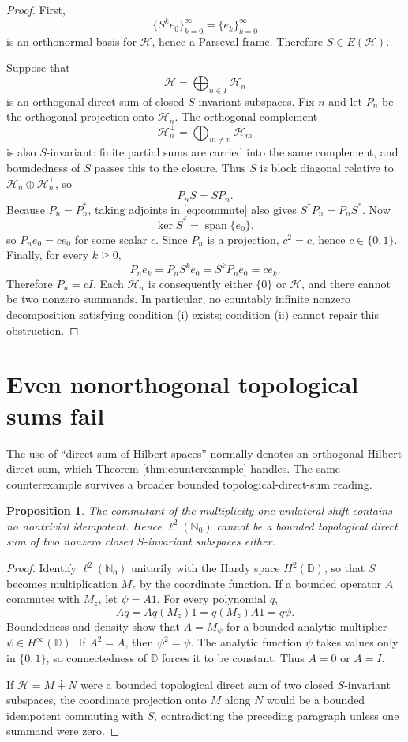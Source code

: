 \documentclass[11pt]{article}
\newtheorem{proposition}[theorem]{Proposition}
\newcommand{\Hh}{\mathcal H}
\newcommand{\N}{\mathbb N}
\begin{document}
\begin{proof}
First,
\[
 \{S^ke_0\}_{k=0}^{\infty}=\{e_k\}_{k=0}^{\infty}
\]
is an orthonormal basis for $\Hh$, hence a Parseval frame.  Therefore
$S\in E(\Hh)$.

Suppose that
\[
 \Hh=\bigoplus_{n\in I}\Hh_n
\]
is an orthogonal direct sum of closed $S$-invariant subspaces.  Fix $n$ and
let $P_n$ be the orthogonal projection onto $\Hh_n$.  The orthogonal
complement
\[
 \Hh_n^\perp=\bigoplus_{m\ne n}\Hh_m
\]
is also $S$-invariant: finite partial sums are carried into the same
complement, and boundedness of $S$ passes this to the closure.  Thus $S$ is
block diagonal relative to $\Hh_n\oplus\Hh_n^\perp$, so
\begin{equation}\label{eq:commute}
 P_nS=SP_n.
\end{equation}
Because $P_n=P_n^*$, taking adjoints in \eqref{eq:commute} also gives
$S^*P_n=P_nS^*$.  Now
\[
 \ker S^*=\operatorname{span}\{e_0\},
\]
so $P_ne_0=ce_0$ for some scalar $c$.  Since $P_n$ is a projection,
$c^2=c$, hence $c\in\{0,1\}$.  Finally, for every $k\ge0$,
\[
 P_ne_k=P_nS^ke_0=S^kP_ne_0=ce_k.
\]
Therefore $P_n=cI$.  Each $\Hh_n$ is consequently either $\{0\}$ or
$\Hh$, and there cannot be two nonzero summands.  In particular, no
countably infinite nonzero decomposition satisfying condition (i) exists;
condition (ii) cannot repair this obstruction.
\end{proof}

\section{Even nonorthogonal topological sums fail}

The use of ``direct sum of Hilbert spaces'' normally denotes an orthogonal
Hilbert direct sum, which Theorem \ref{thm:counterexample} handles.  The same
counterexample survives a broader bounded topological-direct-sum reading.

\begin{proposition}\label{prop:topological}
The commutant of the multiplicity-one unilateral shift contains no
nontrivial idempotent.  Hence $\ell^2(\N_0)$ cannot be a bounded topological
direct sum of two nonzero closed $S$-invariant subspaces either.
\end{proposition}

\begin{proof}
Identify $\ell^2(\N_0)$ unitarily with the Hardy space $H^2(\mathbb D)$,
so that $S$ becomes multiplication $M_z$ by the coordinate function.  If a
bounded operator $A$ commutes with $M_z$, let $\psi=A1$.  For every polynomial
$q$,
\[
 Aq=Aq(M_z)1=q(M_z)A1=q\psi.
\]
Boundedness and density show that $A=M_\psi$ for a bounded analytic
multiplier $\psi\in H^\infty(\mathbb D)$.  If $A^2=A$, then
$\psi^2=\psi$.  The analytic function $\psi$ takes values only in
$\{0,1\}$, so connectedness of $\mathbb D$ forces it to be constant.  Thus
$A=0$ or $A=I$.

If $\Hh=M\dotplus N$ were a bounded topological direct sum of two closed
$S$-invariant subspaces, the coordinate projection onto $M$ along $N$ would
be a bounded idempotent commuting with $S$, contradicting the preceding
paragraph unless one summand were zero.
\end{proof}
\end{document}
